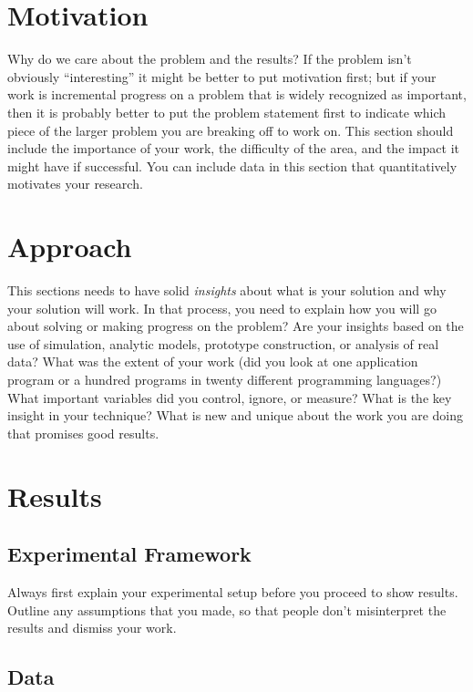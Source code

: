 \documentclass[conference]{IEEEtran}
\begin{document}
\section{Motivation}

Why do we care about the problem and the results? If the problem isn't obviously ``interesting'' it might be better to put motivation first; but if your work is incremental progress on a problem that is widely recognized as important, then it is probably better to put the problem statement first to indicate which piece of the larger problem you are breaking off to work on. This section should include the importance of your work, the difficulty of the area, and the impact it might have if successful. You can include data in this section that quantitatively motivates your research.

\section{Approach}

This sections needs to have solid {\it insights} about what is your solution and why your solution will work. In that process, you need to explain how you will go about solving or making progress on the problem? Are your insights based on the use of simulation, analytic models, prototype construction, or analysis of real data? What was the extent of your work (did you look at one application program or a hundred programs in twenty different programming languages?) What important variables did you control, ignore, or measure? What is the key insight in your technique? What is new and unique about the work you are doing that promises good results.


\section{Results}

\subsection{Experimental Framework}

Always first explain your experimental setup before you proceed to show results. Outline any assumptions that you made, so that people don't misinterpret the results and dismiss your work.

\subsection{Data}
\end{document}
